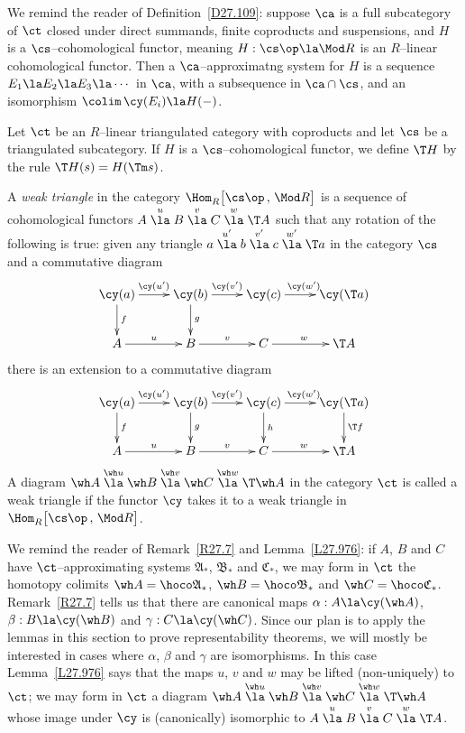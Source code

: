 \documentclass[11pt]{amsart}
\begin{document}
We remind the reader of
Definition~\ref{D27.109}: suppose $\ca$ is a full subcategory of $\ct$
closed under
direct summands, finite coproducts and suspensions, and $H$
is a $\cs$--cohomological functor, meaning $H:\cs\op\la\Mod R$ is
an $R$--linear cohomological functor. Then a
$\ca$--approximatng system for $H$ is a sequence
$E_1\la E_2\la E_3\la\cdots$ in $\ca$, with a subsequence in $\ca\cap\cs$,
and an isomorphism $\colim\,\cy(E_i)\la H(-)$.
\entn





Let $\ct$ be an $R$--linear triangulated category with coproducts and let $\cs$
be a triangulated subcategory. If $H$ is a $\cs$--cohomological functor,
we define
$\T H$ by the rule $\T H(s)=H(\Tm s)$.

A \emph{weak triangle} in the category $\Hom_R^{}\big[\cs\op\,,\,\Mod R\big]$
is a sequence  of cohomological
functors $A\stackrel u\la B\stackrel v\la C\stackrel w\la\T A$
such that
any rotation of the following is true: given any triangle
$a\stackrel {u'}\la b\stackrel {v'}\la c\stackrel {w'}\la \T a$
in the category $\cs$ and a 
  commutative diagram
  \[\xymatrix{
    \cy(a)\ar[r]^{\cy(u')}\ar[d]^{f} & \cy(b)\ar[r]^{\cy(v')}\ar[d]^{g} &
    \cy(c)\ar[r]^{\cy(w')} &\cy( \T a) \\
A\ar[r]^{u} & B\ar[r]^{v} &
    C\ar[r]^{w} & \T A 
  }\]
  there is an  extension 
  to a commutative diagram
  \[\xymatrix{
   \cy(a)\ar[r]^{\cy(u')}\ar[d]^{f} & \cy(b)\ar[r]^{\cy(v')}\ar[d]^{g} &
    \cy(c)\ar[r]^{\cy(w')}\ar[d]^{h}  &\cy( \T a)\ar[d]^{\T f} \\
A\ar[r]^{u} & B\ar[r]^{v} &
    C\ar[r]^{w} & \T A 
  }\]
A diagram
$\wh A\stackrel{\wh u}\la \wh B\stackrel{\wh v}\la\wh C\stackrel{\wh w}\la\T \wh A$ in the category $\ct$ is called a weak triangle if the functor
$\cy$ takes it to a weak triangle in $\Hom_R^{}\big[\cs\op\,,\,\Mod R\big]$.
\edfn

We remind the reader of Remark~\ref{R27.7}
and Lemma~\ref{L27.976}: if
$A$, $B$ and $C$ have $\ct$--approximating systems
$\mathfrak{A}_*$, $\mathfrak{B}_*$ and $\mathfrak{C}_*$, we may form in $\ct$
the
homotopy colimits $\wh A=\hoco\mathfrak{A}_*$, $\wh B=\hoco\mathfrak{B}_*$
and $\wh C=\hoco\mathfrak{C}_*$. Remark~\ref{R27.7}
tells us that 
there are canonical maps $\alpha:A\la\cy(\wh A)$, $\beta:B\la\cy(\wh B)$
and $\gamma:C\la\cy(\wh C)$. Since our plan is to apply the lemmas in
this section to prove representability theorems, we will mostly
be interested in cases where $\alpha$, $\beta$ and $\gamma$ are
isomorphisms. In this case Lemma~\ref{L27.976}
says that the maps $u$, $v$ and $w$ may be lifted (non-uniquely) to $\ct$;
we may form in $\ct$
a diagram
$\wh A\stackrel{\wh u}\la \wh B\stackrel{\wh v}\la\wh C\stackrel{\wh w}\la\T \wh A$
whose image under $\cy$ is (canonically) isomorphic to 
$A\stackrel u\la B\stackrel v\la C\stackrel w\la\T A$.
\ermk
\end{document}
